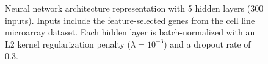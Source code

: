 \documentclass[10pt, letterpaper, twocolumn]{article}
\begin{document}
\begin{figure}[ht]
    \caption{Neural network architecture representation with 5 hidden layers (300 inputs). Inputs include the feature-selected genes from the cell line microarray dataset. Each hidden layer is batch-normalized with an L2 kernel regularization penalty ($\lambda=10^{-3}$) and a dropout rate of 0.3.}
    \label{fig:neural_vis}
\end{figure}
\end{document}

